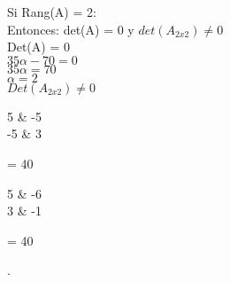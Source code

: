 \begin{frame}
\begin{solution}
    Si Rang(A) = 2: \\
    Entonces: det(A) = 0  y $det(A_{2x2})\neq 0 $ \\
    Det(A) = 0 \\
    $35\alpha - 70 = 0 $ \\
    $35 \alpha = 70$ \\
    $\alpha = 2$ \\

    $Det(A_{2x2}) \neq 0$ \\
    
    \begin{vmatrix}
		5     & -5 \\
		-5    &  3
	\end{vmatrix}= 40 \\

    \begin{vmatrix}
		5     & -6 \\
		3     & -1 
	\end{vmatrix}= 40 \\





 
	\end{solution}
\end{frame}

\begin{frame}
	\begin{solution}

		.
	\end{solution}
\end{frame}